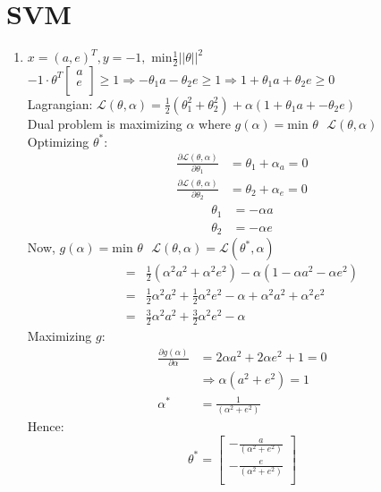 \documentclass[11pt]{article}
\newcommand{\solution}[1]{{{\color{blue}{\bf Solution:} {#1}}}}
\begin{document}
\section{SVM}
\begin{enumerate}
\item
\solution{
$x = (a, e)^T, y=-1,$ min$\frac{1}{2}||\theta||^2$ \\
$-1 \cdot \theta^T\begin{bmatrix} a \\ e \\ \end{bmatrix} \geq 1 \Rightarrow -\theta_1 a - \theta_2 e \geq 1 \Rightarrow 1 + \theta_1 a + \theta_2 e \geq 0$ \\
Lagrangian: $\mathcal{L}(\theta, \alpha) = \frac{1}{2}(\theta_1^2 + \theta_2^2) + \alpha(1+\theta_1a+- \theta_2e )$ \\
Dual problem is maximizing $\alpha$ where $g(\alpha) = \text{min }\theta\text{ } \mathcal{L}(\theta, \alpha)$ \\
Optimizing $\theta^*$: \\
\begin{align}
\frac{\partial \mathcal{L}(\theta, \alpha)}{\partial\theta_1} &= \theta_1 + \alpha_a = 0 \\
\frac{\partial \mathcal{L}(\theta, \alpha)}{\partial\theta_2} &= \theta_2 + \alpha_e = 0
\end{align}
\begin{align}
\theta_1 &= -\alpha a \\
\theta_2 &= -\alpha e 
\end{align}
Now, $g(\alpha) = \text{min }\theta \text{ } \mathcal{L}(\theta, \alpha) =  \mathcal{L}(\theta^*, \alpha)$
\begin{align}
= &\frac{1}{2}(\alpha^2a^2 + \alpha^2e^2)-\alpha(1-\alpha a^2 - \alpha e^2) \\
= &\frac{1}{2}\alpha^2a^2+\frac{1}{2}\alpha^2e^2 - \alpha + \alpha^2a^2 + \alpha^2e^2 \\
= &\frac{3}{2}\alpha^2a^2 + \frac{3}{2}\alpha^2e^2-\alpha
\end{align}
Maximizing $g$:
\begin{align}
\frac{\partial g(\alpha)}{\partial \alpha} &= 2 \alpha a^2 + 2\alpha e^2 + 1 = 0 \\
&\Rightarrow \alpha(a^2 + e^2) = 1 \\
\alpha^* &= \frac{1}{(\alpha^2 + e^2)}
\end{align}
Hence:
\begin{equation}
\theta^* =
\begin{bmatrix}
-\frac{a}{(\alpha^2 + e^2)} \\
-\frac{e}{(\alpha^2 + e^2)} \\
\end{bmatrix}
\end{equation}
}
\newpage


\end{enumerate}
\end{document}
